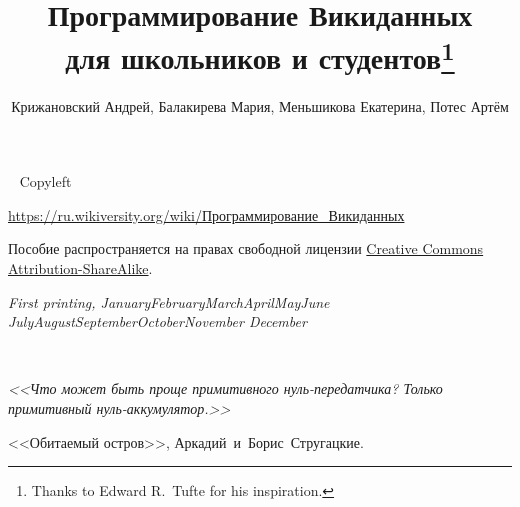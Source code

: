 \documentclass{tufte-book}
\title{Программирование Викиданных \\для школьников и студентов\thanks{Thanks to Edward R.~Tufte for his inspiration.}}
\author[Крижановский Андрей, Балакирева Мария, Меньшикова Екатерина, Потес Артём]{Крижановский Андрей, Балакирева Мария, Меньшикова Екатерина, Потес Артём}
\theoremstyle{definition}
\newcommand{\monthyear}{%
  \ifcase\month\or January\or February\or March\or April\or May\or June\or
  July\or August\or September\or October\or November\or
  December\fi\space\number\year
}
\newcommand{\openepigraph}[2]{%
  \begin{fullwidth}
  \sffamily\large
  \begin{doublespace}
  \noindent\allcaps{#1}\\%
  \noindent\allcaps{#2}%
  \end{doublespace}
  \end{fullwidth}
}
\newcommand{\blankpage}{\newpage\hbox{}\thispagestyle{empty}\newpage}
\begin{document}




\maketitle


\newpage
\begin{fullwidth}
~\vfill
\thispagestyle{empty}
\setlength{\parindent}{0pt}
\setlength{\parskip}{\baselineskip}
Copyleft \textcopyleft\ \the\year\ \thanklessauthor

\par{}

\par\href{https://w.wiki/62E}{https://ru.wikiversity.org/wiki/Программирование\_Викиданных}

\par Пособие распространяется на правах свободной лицензии 
    \href{https://creativecommons.org/licenses/by-sa/4.0/deed.ru}{Creative Commons Attribution-ShareAlike}.


\par\textit{First printing, \monthyear}
\end{fullwidth}

\tableofcontents

\listoffigures

\listoftables

\cleardoublepage
~\vfill
\begin{doublespace}
\noindent\fontsize{18}{22}\selectfont\itshape
\nohyphenation
<<Что может быть проще примитивного нуль-передатчика? Только примитивный нуль-аккумулятор.>>

<<Обитаемый остров>>, \mbox{Аркадий и Борис Стругацкие}.
\end{doublespace}
\vfill
\end{document}
